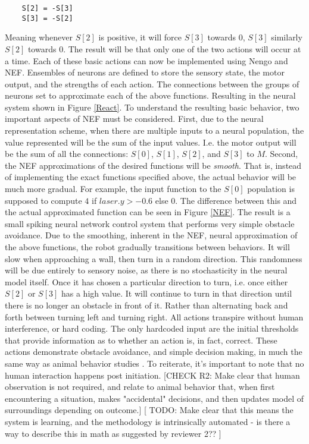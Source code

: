 \documentclass[conference]{IEEEtran}
\begin{document}
\begin{lstlisting}
	S[2] = -S[3]
	S[3] = -S[2]
\end{lstlisting}
Meaning whenever $S[2]$ is positive, it will force $S[3]$ towards $0$, $S[3]$ similarly $S[2]$ towards $0$.
The result will be that only one of the two actions will occur at a time. Each of these basic actions can now be implemented using Nengo and NEF. Ensembles of neurons are defined to store the sensory state, the motor output, and the strengths of each action. The connections between the groups of neurons set to approximate each of the above functions. Resulting in the neural system shown in Figure \ref{React}. To understand the resulting basic behavior, two important aspects of NEF must be considered. First, due to the neural representation scheme, when there are multiple inputs to a neural population, the value represented will be the sum of the input values. I.e. the motor output will be the sum of all the connections: $S[0]$, $S[1]$, $S[2]$, and $S[3]$ to $M$. Second, the NEF approximations of the desired functions will be \textit{smooth}. That is, instead of implementing the exact functions specified above, the actual behavior will be much more gradual. For example, the input function to the $S[0]$ population is supposed to compute $4$ if $laser.y > -0.6$ else $0$. The difference between this and the actual approximated function can be seen in Figure \ref{NEF}.
The result is a small spiking neural network control system that performs very simple obstacle avoidance. Due to the smoothing, inherent in the NEF, neural approximation of the above functions, the robot gradually transitions between behaviors. It will slow when approaching a wall, then turn in a random direction. This randomness will be due entirely to sensory noise, as there is no stochasticity in the neural model itself. Once it has chosen a particular direction to turn, i.e. once either $S[2]$ or $S[3]$ has a high value. It will continue to turn in that direction until there is no longer an obstacle in front of it. Rather than alternating back and forth between turning left and turning right. All actions transpire without human interference, or hard coding. The only hardcoded input are the initial thresholds that provide information as to whether an action is, in fact, correct. These actions demonstrate obstacle avoidance, and simple decision making, in much the same way as animal behavior studies  \cite{kim2007encoding}. To reiterate, it's important to note that no human interaction happens post initiation. [CHECK R2: Make clear that human observation is not required, and relate to animal behavior that, when first encountering a situation, makes "accidental" decisions, and then updates model of surroundings depending on outcome.] [ TODO: Make clear that this means the system is learning, and the methodology is intrinsically automated - is there a way to describe this in math as suggested by reviewer 2?? ]
\end{document}
